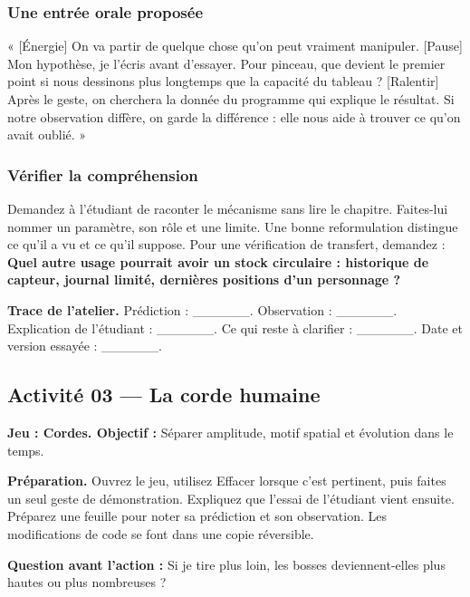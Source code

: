 \documentclass[
  canadien,
  11pt,
  letterpaper,
]{article}
\begin{document}
\subsubsection{Une entrée orale
proposée}\label{une-entruxe9e-orale-proposuxe9e-1}

« {[}Énergie{]} On va partir de quelque chose qu'on peut vraiment
manipuler. {[}Pause{]} Mon hypothèse, je l'écris avant d'essayer. Pour
pinceau, que devient le premier point si nous dessinons plus longtemps
que la capacité du tableau ? {[}Ralentir{]} Après le geste, on cherchera
la donnée du programme qui explique le résultat. Si notre observation
diffère, on garde la différence : elle nous aide à trouver ce qu'on
avait oublié. »

\subsubsection{Vérifier la
compréhension}\label{vuxe9rifier-la-compruxe9hension-1}

Demandez à l'étudiant de raconter le mécanisme sans lire le chapitre.
Faites-lui nommer un paramètre, son rôle et une limite. Une bonne
reformulation distingue ce qu'il a vu et ce qu'il suppose. Pour une
vérification de transfert, demandez : \textbf{Quel autre usage pourrait
avoir un stock circulaire : historique de capteur, journal limité,
dernières positions d'un personnage ?}

\textbf{Trace de l'atelier.} Prédiction : \_\_\_\_\_\_. Observation :
\_\_\_\_\_\_. Explication de l'étudiant : \_\_\_\_\_\_. Ce qui reste à
clarifier : \_\_\_\_\_\_. Date et version essayée : \_\_\_\_\_\_.

\subsection{Activité 03 --- La corde
humaine}\label{activituxe9-03-la-corde-humaine}

\textbf{Jeu : Cordes. Objectif :} Séparer amplitude, motif spatial et
évolution dans le temps.

\textbf{Préparation.} Ouvrez le jeu, utilisez Effacer lorsque c'est
pertinent, puis faites un seul geste de démonstration. Expliquez que
l'essai de l'étudiant vient ensuite. Préparez une feuille pour noter sa
prédiction et son observation. Les modifications de code se font dans
une copie réversible.

\textbf{Question avant l'action :} Si je tire plus loin, les bosses
deviennent-elles plus hautes ou plus nombreuses ?
\end{document}

